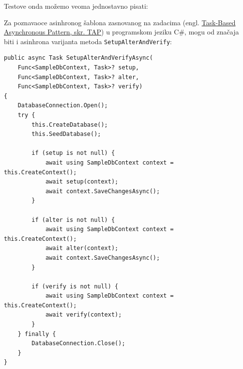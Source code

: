 Testove onda možemo veoma jednostavno pisati:


Za poznavaoce asinhronog šablona zasnovanog na zadacima (engl. \href{https://learn.microsoft.com/en-us/dotnet/standard/asynchronous-programming-patterns/task-based-asynchronous-pattern-tap}{Task-Based Asynchronous Pattern, skr. TAP}) u programskom jeziku C\#, mogu od značaja biti i asinhrona varijanta metoda \texttt{SetupAlterAndVerify}:

\begin{verbatim}
public async Task SetupAlterAndVerifyAsync(
    Func<SampleDbContext, Task>? setup,
    Func<SampleDbContext, Task>? alter,
    Func<SampleDbContext, Task>? verify)
{
    DatabaseConnection.Open();
    try {
        this.CreateDatabase();
        this.SeedDatabase();

        if (setup is not null) {
            await using SampleDbContext context = this.CreateContext();
            await setup(context);
            await context.SaveChangesAsync();
        }

        if (alter is not null) {
            await using SampleDbContext context = this.CreateContext();
            await alter(context);
            await context.SaveChangesAsync();
        }

        if (verify is not null) {
            await using SampleDbContext context = this.CreateContext();
            await verify(context);
        }
    } finally {
        DatabaseConnection.Close();
    }
}
\end{verbatim}
